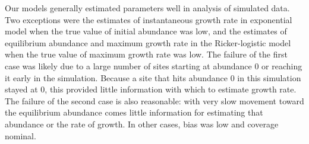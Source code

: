 \documentclass[12pt]{article}
\begin{document}
Our models generally estimated parameters well in analysis of simulated data.
Two exceptions were the estimates of instantaneous growth rate in exponential model when the 
true value of initial abundance was low, and the estimates of equilibrium abundance and maximum
growth rate in the Ricker-logistic model when the true value of maximum growth rate was low.  
The failure of the first case was likely due to a large number of sites starting at abundance 0 or reaching it early in the simulation.  
Because a site that hits abundance 0 in this simulation stayed at 0, this provided little information with
which to estimate growth rate.  The failure of the second case is also reasonable: with very
slow movement toward the equilibrium abundance comes little information for estimating
that abundance or the rate of growth.  In other cases, bias was low and coverage nominal.

\end{document}
